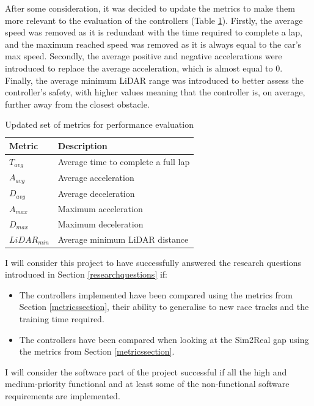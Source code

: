 After some consideration, it was decided to update the metrics to make them more relevant to the evaluation of the controllers (Table \ref{updatedmetrics}). Firstly, the average speed was removed as it is redundant with the time required to complete a lap, and the maximum reached speed was removed as it is always equal to the car's max speed. Secondly, the average positive and negative accelerations were introduced to replace the average acceleration, which is almost equal to 0. Finally, the average minimum LiDAR range was introduced to better assess the controller's safety, with higher values meaning that the controller is, on average, further away from the closest obstacle. \\

\begin{table}[H]
\centering
\begin{tabularx}{\textwidth}{||l X||}
 \hline
 Metric & Description\\ [0.5ex]
 \hline\hline
 $T_{avg}$ & Average time to complete a full lap \\
 $A_{avg}$ & Average acceleration \\
 $D_{avg}$ & Average deceleration \\
 $A_{max}$ & Maximum acceleration \\
 $D_{max}$ & Maximum deceleration \\
 $LiDAR_{min}$ & Average minimum LiDAR distance \\ [1ex]
\hline
\end{tabularx}
\caption{Updated set of metrics for performance evaluation}
\label{updatedmetrics}
\end{table}

I will consider this project to have successfully answered the research questions introduced in Section \ref{researchquestions} if:
\begin{itemize}
	\item The controllers implemented have been compared using the metrics from Section \ref{metricssection}, their ability to generalise to new race tracks and the training time required.
	\item The controllers have been compared when looking at the Sim2Real gap using the metrics from Section \ref{metricssection}.
\end{itemize}

I will consider the software part of the project successful if all the high and medium-priority functional and at least some of the non-functional software requirements are implemented.

